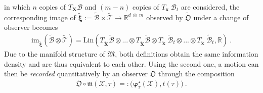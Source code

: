 in which $n$ copies of $T_{\boldsymbol{X}}\mathcal{B}$ and $(m\!-\!n)$ copies of $T_{\boldsymbol{x}}\;\!\mathcal{B}_{t}$ are considered, the corresponding image of $\tilde{\boldsymbol{\xi}}\!:=\!\tilde{\mathcal{B}}\times\tilde{\mathcal{T}}\to\mathbb{R}^{d\;\!\otimes\;\!m}$ observed by $\tilde{\mathfrak{O}}$ under a change of observer becomes
\begin{align}
	\mathrm{im}_{\tilde{\boldsymbol{\xi}}}(\tilde{\mathcal{B}}\otimes\tilde{\mathcal{T}})\!=\!\mathrm{Lin}(T_{\tilde{\boldsymbol{X}}}\tilde{\mathcal{B}}\otimes...\otimes T_{\tilde{\boldsymbol{X}}}\tilde{\mathcal{B}} \otimes T_{\tilde{\boldsymbol{x}}}\;\!\tilde{\mathcal{B}}_{t}\otimes ... \otimes T_{\tilde{\boldsymbol{x}}}\;\!\tilde{\mathcal{B}}_{t}, \mathbb{R}) \ .
\end{align}
\clearpage
Due to the manifold structure of $\mathfrak{M}$, both definitions obtain the same information density and are thus equivalent to each other. Using the second one, a motion can then be \emph{recorded} quantitatively by an observer $\mathfrak{O}$ through the composition
\begin{align}
	\mathfrak{O}\circ\mathfrak{m}(\mathcal{X},\tau)\!=:\!\big( \boldsymbol{\varphi}^{\star}_{\tau}(\mathcal{X}), t(\tau) \big) \ .
\end{align}

